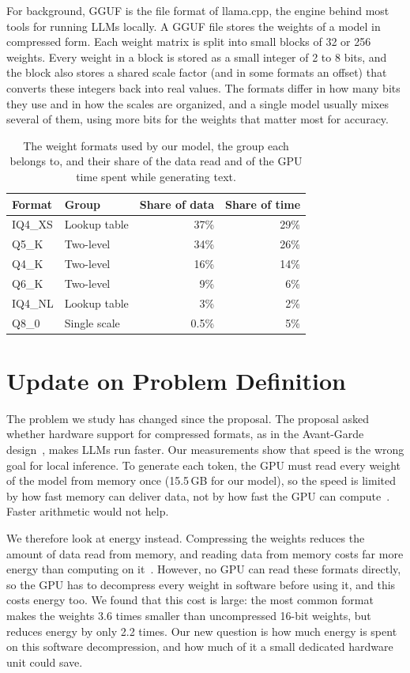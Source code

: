 \documentclass[10pt,twocolumn,letterpaper]{article}
\begin{document}
For background, GGUF is the file format of llama.cpp, the engine behind most tools for running LLMs locally. A GGUF
file stores the weights of a model in compressed form. Each weight matrix is split into small blocks of 32 or 256
weights. Every weight in a block is stored as a small integer of 2 to 8 bits, and the block also stores a shared
scale factor (and in some formats an offset) that converts these integers back into real values. The formats
differ in how many bits they use and in how the scales are organized, and a single model usually mixes several of
them, using more bits for the weights that matter most for accuracy.

\begin{table}[t]
\centering\small
\caption{The weight formats used by our model, the group each belongs to, and their share of the data read and of
the GPU time spent while generating text.}
\label{tab:model}
\begin{tabular}{@{}llrr@{}}
\toprule
Format & Group & Share of data & Share of time\\
\midrule
IQ4\_XS & Lookup table & 37\% & 29\%\\
Q5\_K & Two-level & 34\% & 26\%\\
Q4\_K & Two-level & 16\% & 14\%\\
Q6\_K & Two-level & 9\% & 6\%\\
IQ4\_NL & Lookup table & 3\% & 2\%\\
Q8\_0 & Single scale & 0.5\% & 5\%\\
\bottomrule
\end{tabular}
\end{table}

\section{Update on Problem Definition}

The problem we study has changed since the proposal. The proposal asked whether hardware support for compressed
formats, as in the Avant-Garde design~\cite{ag}, makes LLMs run faster. Our measurements show that speed is the
wrong goal for local inference. To generate each token, the GPU must read every weight of the model from memory once
(15.5\,GB for our model), so the speed is limited by how fast memory can deliver data, not by how fast the GPU can
compute~\cite{splitwise,flute}. Faster arithmetic would not help.

We therefore look at energy instead. Compressing the weights reduces the amount of data read from memory, and
reading data from memory costs far more energy than computing on it~\cite{horowitz}. However, no GPU can read these
formats directly, so the GPU has to decompress every weight in software before using it, and this costs energy too.
We found that this cost is large: the most common format makes the weights 3.6 times smaller than uncompressed
16-bit weights, but reduces energy by only 2.2 times. Our new question is how much energy is spent on this software
decompression, and how much of it a small dedicated hardware unit could save.
\end{document}
